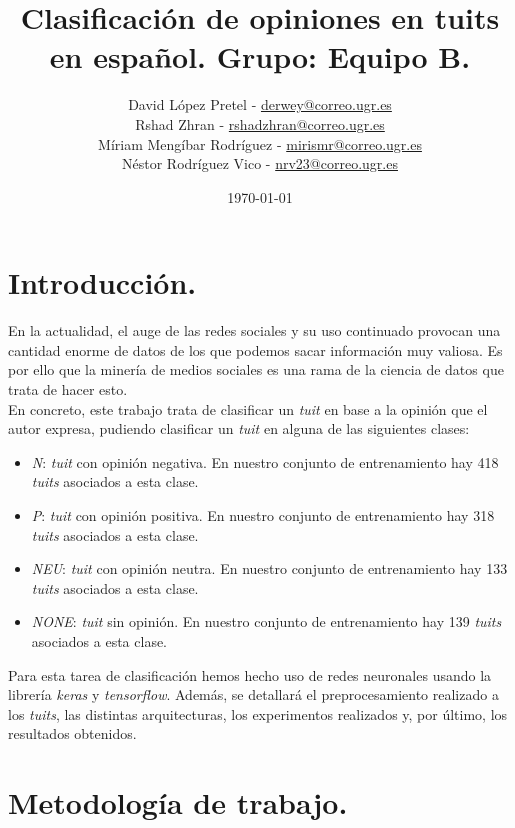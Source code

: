 \documentclass[11pt]{article}
\title{Clasificación de opiniones en tuits en español. Grupo: Equipo B.}
\author{David López Pretel - \href{mailto:derwey@correo.ugr.es}{derwey@correo.ugr.es} \\
Rshad Zhran - \href{mailto:rshadzhran@correo.ugr.es}{rshadzhran@correo.ugr.es} \\
Míriam Mengíbar Rodríguez - \href{mailto:mirismr@correo.ugr.es}{mirismr@correo.ugr.es} \\
Néstor Rodríguez Vico - \href{mailto:nrv23@correo.ugr.es}{nrv23@correo.ugr.es}}
\date{\today}
\begin{document}
\maketitle

\clearpage

\tableofcontents

\clearpage


\section{Introducción.}

En la actualidad, el auge de las redes sociales y su uso continuado provocan una cantidad enorme de datos de los que podemos sacar información muy valiosa. Es por ello que la minería de medios sociales es una rama de la ciencia de datos que trata de hacer esto. \\

En concreto, este trabajo trata de clasificar un \textit{tuit} en base a la opinión que el autor expresa, pudiendo clasificar un \textit{tuit} en alguna de las siguientes clases:

\begin{itemize}
    \item \textit{N}: \textit{tuit} con opinión negativa. En nuestro conjunto de entrenamiento hay 418 \textit{tuits} asociados a esta clase.
    \item \textit{P}: \textit{tuit} con opinión positiva. En nuestro conjunto de entrenamiento hay 318 \textit{tuits} asociados a esta clase.
    \item \textit{NEU}: \textit{tuit} con opinión neutra. En nuestro conjunto de entrenamiento hay 133 \textit{tuits} asociados a esta clase.
    \item \textit{NONE}: \textit{tuit} sin opinión. En nuestro conjunto de entrenamiento hay 139 \textit{tuits} asociados a esta clase.
\end{itemize}

Para esta tarea de clasificación hemos hecho uso de redes neuronales usando la librería \textit{keras} y \textit{tensorflow}. Además, se detallará el preprocesamiento realizado a los \textit{tuits}, las distintas arquitecturas, los experimentos realizados y, por último, los resultados obtenidos.

\section{Metodología de trabajo.}
\end{document}
